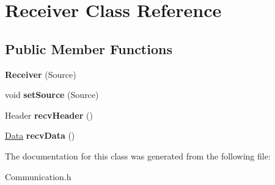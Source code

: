 \hypertarget{classReceiver}{\section{Receiver Class Reference}
\label{classReceiver}
}
\subsection*{Public Member Functions}
\begin{DoxyCompactItemize}
\item 
\hypertarget{classReceiver_a0464fd19299f218b8c207211fbc71d4a}{{\bfseries Receiver} (Source)}\label{classReceiver_a0464fd19299f218b8c207211fbc71d4a}

\item 
\hypertarget{classReceiver_aad4a8442daea23dda4fedfb1bbd50eb6}{void {\bfseries set\-Source} (Source)}\label{classReceiver_aad4a8442daea23dda4fedfb1bbd50eb6}

\item 
\hypertarget{classReceiver_a6fbd0955d9f38741b89b2344a9d8d917}{Header {\bfseries recv\-Header} ()}\label{classReceiver_a6fbd0955d9f38741b89b2344a9d8d917}

\item 
\hypertarget{classReceiver_ac5f244003188d579c26a94cc60b38c31}{\hyperlink{classData}{Data} {\bfseries recv\-Data} ()}\label{classReceiver_ac5f244003188d579c26a94cc60b38c31}

\end{DoxyCompactItemize}


The documentation for this class was generated from the following file\-:\begin{DoxyCompactItemize}
\item 
Communication.\-h\end{DoxyCompactItemize}
